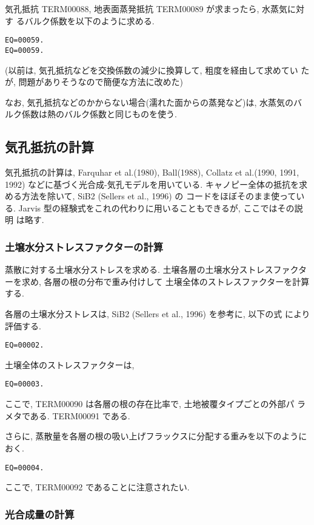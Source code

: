 気孔抵抗 TERM00088, 地表面蒸発抵抗 TERM00089 が求まったら, 水蒸気に対す
るバルク係数を以下のように求める.
\begin{verbatim}
EQ=00059.
EQ=00059.
\end{verbatim}
(以前は, 気孔抵抗などを交換係数の減少に換算して, 粗度を経由して求めてい
たが, 問題がありそうなので簡便な方法に改めた)

なお, 気孔抵抗などのかからない場合(濡れた面からの蒸発など)は, 水蒸気のバ
ルク係数は熱のバルク係数と同じものを使う.

\subsection{気孔抵抗の計算}

気孔抵抗の計算は, Farquhar et al.(1980), Ball(1988), Collatz et
al.(1990, 1991, 1992) などに基づく光合成-気孔モデルを用いている.
キャノピー全体の抵抗を求める方法を除いて, SiB2 (Sellers et al., 1996) の
コードをほぼそのまま使っている.
Jarvis 型の経験式をこれの代わりに用いることもできるが, ここではその説明
は略す.

\subsubsection{土壌水分ストレスファクターの計算}

蒸散に対する土壌水分ストレスを求める.
土壌各層の土壌水分ストレスファクターを求め, 各層の根の分布で重み付けして
土壌全体のストレスファクターを計算する.

各層の土壌水分ストレスは, SiB2 (Sellers et al., 1996) を参考に, 以下の式
により評価する.
\begin{verbatim}
EQ=00002.
\end{verbatim}
土壌全体のストレスファクターは,
\begin{verbatim}
EQ=00003.
\end{verbatim}
ここで, TERM00090 は各層の根の存在比率で, 土地被覆タイプごとの外部パ
ラメタである. TERM00091 である.

さらに, 蒸散量を各層の根の吸い上げフラックスに分配する重みを以下のように
おく.
\begin{verbatim}
EQ=00004.
\end{verbatim}
ここで, TERM00092 であることに注意されたい.

\subsubsection{光合成量の計算}


